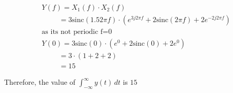\documentclass[journal,12pt,onecolumn]{IEEEtran}
\theoremstyle{remark}
\begin{document}
\begin{align}
& Y(f) = X_1(f) \cdot X_2(f) \\
&\hspace{1cm}= 3\text{sinc}(1.5 2\pi f) \cdot (e^{3j2\pi f} + 2\text{sinc}(2\pi f) + 2e^{-2j2\pi f})\\
&\text{as its not periodic f=0}\\
& Y(0)= 3\text{sinc}(0) \cdot (e^{0} + 2\text{sinc}(0) + 2e^{0}) \\
&\hspace{1cm}= 3\cdot (1 + 2 + 2) \\
&\hspace{1cm}= 15
\end{align}


Therefore, the value of $\int_{-\infty}^{\infty} y(t) \, dt$ is $15$
\end{document}
